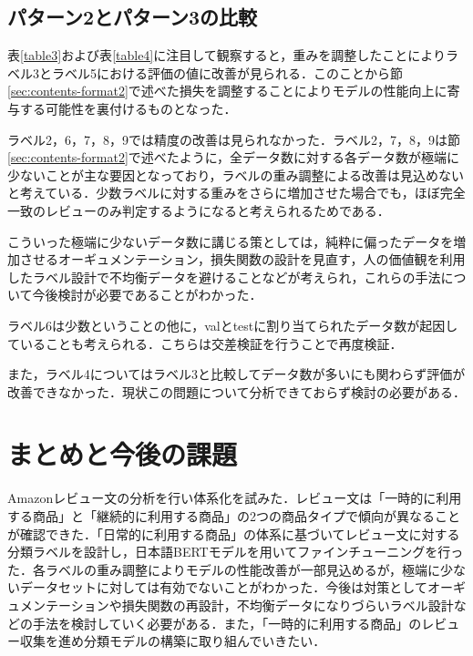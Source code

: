 \documentclass[
  platex, dvipdfmx,  %
]{nlp2024}
\begin{document}
\subsection{パターン2とパターン3の比較}
表\ref{table3}および表\ref{table4}に注目して観察すると，重みを調整したことによりラベル3とラベル5における評価の値に改善が見られる．このことから節\ref{sec:contents-format2}で述べた損失を調整することによりモデルの性能向上に寄与する可能性を裏付けるものとなった．

ラベル2，6，7，8，9では精度の改善は見られなかった．ラベル2，7，8，9は節\ref{sec:contents-format2}で述べたように，全データ数に対する各データ数が極端に少ないことが主な要因となっており，ラベルの重み調整による改善は見込めないと考えている．少数ラベルに対する重みをさらに増加させた場合でも，ほぼ完全一致のレビューのみ判定するようになると考えられるためである．

こういった極端に少ないデータ数に講じる策としては，純粋に偏ったデータを増加させるオーギュメンテーション，損失関数の設計を見直す，人の価値観\cite{Article_07}を利用したラベル設計で不均衡データを避けることなどが考えられ，これらの手法について今後検討が必要であることがわかった．

ラベル6は少数ということの他に，valとtestに割り当てられたデータ数が起因していることも考えられる．こちらは交差検証を行うことで再度検証．

また，ラベル4についてはラベル3と比較してデータ数が多いにも関わらず評価が改善できなかった．現状この問題について分析できておらず検討の必要がある．


\section{まとめと今後の課題}
Amazonレビュー文の分析を行い体系化を試みた．レビュー文は「一時的に利用する商品」と「継続的に利用する商品」の2つの商品タイプで傾向が異なることが確認できた．「日常的に利用する商品」の体系に基づいてレビュー文に対する分類ラベルを設計し，日本語BERTモデルを用いてファインチューニングを行った．各ラベルの重み調整によりモデルの性能改善が一部見込めるが，極端に少ないデータセットに対しては有効でないことがわかった．今後は対策としてオーギュメンテーションや損失関数の再設計，不均衡データになりづらいラベル設計などの手法を検討していく必要がある．また，「一時的に利用する商品」のレビュー収集を進め分類モデルの構築に取り組んでいきたい．





\clearpage





\clearpage
\appendix

\end{document}
